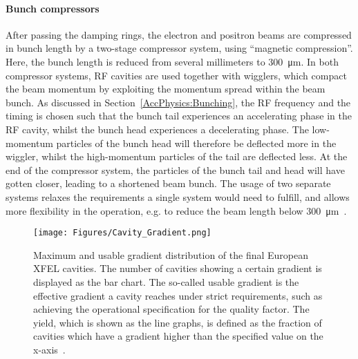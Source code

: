 \paragraph{Bunch compressors}
After passing the damping rings, the electron and positron beams are compressed in bunch length by a two-stage compressor system, using ``magnetic compression''.
Here, the bunch length is reduced from several millimeters to \SI{300}{\micro\meter}.
In both compressor systems, RF cavities are used together with wigglers, which compact the beam momentum by exploiting the momentum spread within the beam bunch.
As discussed in Section~\ref{AccPhysics:Bunching}, the RF frequency and the timing is chosen such that the bunch tail experiences an accelerating phase in the RF cavity, whilst the bunch head experiences a decelerating phase.
The low-momentum particles of the bunch head will therefore be deflected more in the wiggler, whilst the high-momentum particles of the tail are deflected less.
At the end of the compressor system, the particles of the bunch tail and head will have gotten closer, leading to a shortened beam bunch. 
The usage of two separate systems relaxes the requirements a single system would need to fulfill, and allows more flexibility in the operation, e.g. to reduce the beam length below \SI{300}{\micro\meter}~\cite[p. 124]{TDR32}.

\begin{figure}[h!]
\centering
\texttt{[image: Figures/Cavity\_Gradient.png]}
\caption[XFEL cavity gradient]{Maximum and usable gradient distribution of the final European XFEL cavities.
The number of cavities showing a certain gradient is displayed as the bar chart.
The so-called usable gradient is the effective gradient a cavity reaches under strict requirements, such as achieving the operational specification for the quality factor.
The yield, which is shown as the line graphs, is defined as the fraction of cavities which have a gradient higher than the specified value on the x-axis~\cite[p. 18]{XFEL_Cavities}.}
\label{fig:XFEL_cav}
\end{figure}
